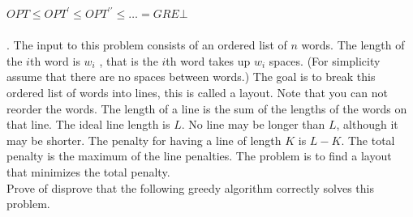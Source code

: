 \documentclass[10pt]{article}
\begin{document}
			$OPT \leq OPT^{\prime} \leq OPT^{\prime\prime} \leq \ldots = GRE \bot$\\
			\\				
			\newpage
			. The input to this problem consists of an ordered list of $n$ words. The length of the $i$th word is $w_{i}$ , that
			is the $i$th word takes up $w_{i}$ spaces.  (For simplicity assume that there are no spaces between words.)
			The goal is to break this ordered list of words into lines, this is called a layout. Note that you can not
			reorder the words.  The length of a line is the sum of the lengths of the words on that line. The ideal
			line length is $L$. No line may be longer than $L$, although it may be shorter.  The penalty for having a
			line of length $K$ is $L - K$. The total penalty is the maximum of the line penalties. The problem is to
			find a layout that minimizes the total penalty.\\
			Prove of disprove that the following greedy algorithm correctly solves this problem.
			
\end{document}
